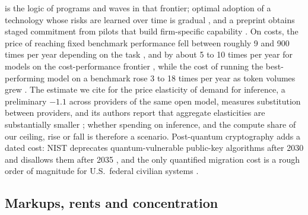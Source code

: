 is the logic of programs and waves in that frontier; optimal adoption of a technology whose risks are learned over time is gradual \citep{acemoglu2024regulating}, and a preprint obtains staged commitment from pilots that build firm-specific capability \citep{tewari2026pilot}. On costs, the price of reaching fixed benchmark performance fell between roughly 9 and 900 times per year depending on the task \citep{epoch2025inference}, and by about 5 to 10 times per year for models on the cost-performance frontier \citep{gundlach2025price}, while the cost of running the best-performing model on a benchmark rose 3 to 18 times per year as token volumes grew \citep{gundlach2025price}. The estimate we cite for the price elasticity of demand for inference, a preliminary $-1.1$ across providers of the same open model, measures substitution between providers, and its authors report that aggregate elasticities are substantially smaller \citep{demirer2025emerging}; whether spending on inference, and the compute share of our ceiling, rise or fall is therefore a scenario. Post-quantum cryptography adds a dated cost: NIST deprecates quantum-vulnerable public-key algorithms after 2030 and disallows them after 2035 \citep{moody2026transition}, and the only quantified migration cost is a rough order of magnitude for U.S.\ federal civilian systems \citep{omb2024report}.

\subsection{Markups, rents and concentration}

